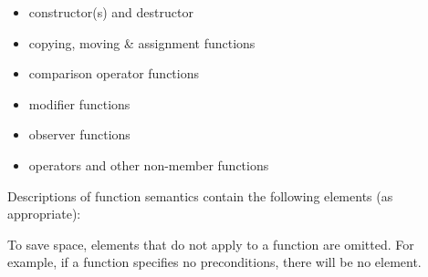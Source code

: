 \begin{itemize}
\item constructor(s) and destructor
\item copying, moving \& assignment functions
\item comparison operator functions
\item modifier functions
\item observer functions
\item operators and other non-member functions
\end{itemize}

\pnum
Descriptions of function semantics contain the following elements (as
appropriate):
\begin{footnote}
To save space, elements that do not apply to a function are omitted.
For example, if a function specifies no
preconditions, there will be no \expects element.
\end{footnote}

